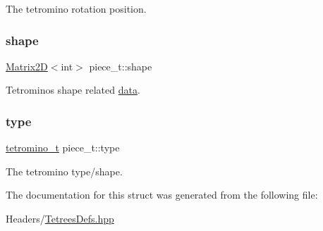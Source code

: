 The tetromino rotation position. \mbox{\label{structpiece__t_a3c8f9c2e51c6bab728e564143c439746}} 
\subsubsection{\texorpdfstring{shape}{shape}}
{\footnotesize\ttfamily \hyperlink{classMatrix2D}{Matrix2D}$<$int$>$ piece\+\_\+t\+::shape}

Tetromino\textquotesingle{}s shape related \hyperlink{classTetreesUtils_acb377319f6772d9e88f677273c895912}{data}. \mbox{\label{structpiece__t_ac5cbbdb5ff335128af8ca9f491a4f543}} 
\subsubsection{\texorpdfstring{type}{type}}
{\footnotesize\ttfamily \hyperlink{TetreesDefs_8hpp_acd279a62a49ecee418dd808ac39a1795}{tetromino\+\_\+t} piece\+\_\+t\+::type}

The tetromino type/shape. 

The documentation for this struct was generated from the following file\+:\begin{DoxyCompactItemize}
\item 
Headers/\hyperlink{TetreesDefs_8hpp}{Tetrees\+Defs.\+hpp}\end{DoxyCompactItemize}
